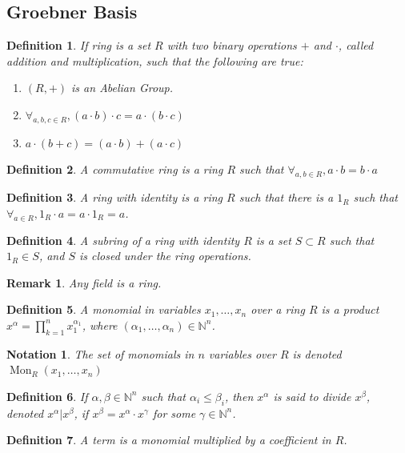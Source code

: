 \documentclass[oneside]{book}
\theoremstyle{mystyle}
\newtheorem{definition}{Definition}[section]
\newtheorem{remark}{Remark}[section]
\newtheorem{notation}{Notation}[section]
\DeclareMathOperator{\Mon}{Mon}
\begin{document}
\subsection{Groebner Basis}
\begin{definition}
If ring is a set $R$ with two binary operations $+$ and $\cdot$, called addition and multiplication, such that the following are true:
\begin{enumerate}
    \item $(R,+)$ is an Abelian Group.
    \item $\forall_{a,b,c\in R}, (a\cdot b)\cdot c = a\cdot(b\cdot c)$
    \item $a\cdot(b+c) = (a\cdot b)+(a\cdot c)$
\end{enumerate}
\end{definition}
\begin{definition}
A commutative ring is a ring $R$ such that $\forall_{a,b\in R}, a\cdot b = b\cdot a$
\end{definition}
\begin{definition}
A ring with identity is a ring $R$ such that there is a $1_{R}$ such that $\forall_{a\in R}, 1_{R}\cdot a = a\cdot 1_{R} = a$.
\end{definition}
\begin{definition}
A subring of a ring with identity $R$ is a set $S\subset R$ such that $1_{R}\in S$, and $S$ is closed under the ring operations.
\end{definition}
\begin{remark}
Any field is a ring.
\end{remark}
\begin{definition}
A monomial in variables $x_1,\hdots, x_n$ over a ring $R$ is a product $x^\alpha = \prod_{k=1}^{n} x_1^{\alpha_1}$, where $(\alpha_1,\hdots, \alpha_n)\in \mathbb{N}^n$.
\end{definition}
\begin{notation}
The set of monomials in $n$ variables over $R$ is denoted $\Mon_{R}(x_1,\hdots, x_n)$
\end{notation}
\begin{definition}
If $\alpha,\beta \in \mathbb{N}^n$ such that $\alpha_i \leq \beta_i$, then $x^{\alpha}$ is said to divide $x^\beta$, denoted $x^\alpha \vert x^\beta$, if $x^\beta = x^\alpha \cdot x^\gamma$ for some $\gamma \in \mathbb{N}^n$.
\end{definition}
\begin{definition}
A term is a monomial multiplied by a coefficient in $R$.
\end{definition}
\end{document}
